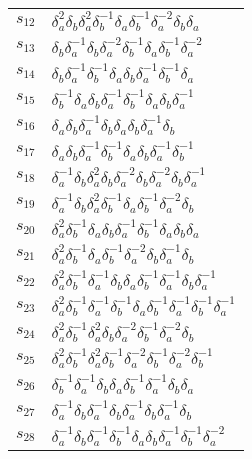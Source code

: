\documentclass{article}
\begin{document}
\begin{center}
\begin{tabular}{ll}
$s_{12}$ & $\delta_a^{2}\delta_b^{}\delta_a^{2}\delta_b^{-1}\delta_a^{}\delta_b^{-1}\delta_a^{-2}\delta_b^{}\delta_a^{}$ \\
$s_{13}$ & $\delta_b^{}\delta_a^{-1}\delta_b^{}\delta_a^{-2}\delta_b^{-1}\delta_a^{}\delta_b^{-1}\delta_a^{-2}$ \\
$s_{14}$ & $\delta_b^{}\delta_a^{-1}\delta_b^{-1}\delta_a^{}\delta_b^{}\delta_a^{-1}\delta_b^{-1}\delta_a^{}$ \\
$s_{15}$ & $\delta_b^{-1}\delta_a^{}\delta_b^{}\delta_a^{-1}\delta_b^{-1}\delta_a^{}\delta_b^{}\delta_a^{-1}$ \\
$s_{16}$ & $\delta_a^{}\delta_b^{}\delta_a^{-1}\delta_b^{}\delta_a^{}\delta_b^{}\delta_a^{-1}\delta_b^{}$ \\
$s_{17}$ & $\delta_a^{}\delta_b^{}\delta_a^{-1}\delta_b^{-1}\delta_a^{}\delta_b^{}\delta_a^{-1}\delta_b^{-1}$ \\
$s_{18}$ & $\delta_a^{-1}\delta_b^{}\delta_a^{2}\delta_b^{}\delta_a^{-2}\delta_b^{}\delta_a^{-2}\delta_b^{}\delta_a^{-1}$ \\
$s_{19}$ & $\delta_a^{-1}\delta_b^{}\delta_a^{2}\delta_b^{-1}\delta_a^{}\delta_b^{-1}\delta_a^{-2}\delta_b^{}$ \\
$s_{20}$ & $\delta_a^{2}\delta_b^{-1}\delta_a^{}\delta_b^{}\delta_a^{-1}\delta_b^{-1}\delta_a^{}\delta_b^{}\delta_a^{}$ \\
$s_{21}$ & $\delta_a^{2}\delta_b^{-1}\delta_a^{}\delta_b^{-1}\delta_a^{-2}\delta_b^{}\delta_a^{-1}\delta_b^{}$ \\
$s_{22}$ & $\delta_a^{2}\delta_b^{-1}\delta_a^{-1}\delta_b^{}\delta_a^{}\delta_b^{-1}\delta_a^{-1}\delta_b^{}\delta_a^{-1}$ \\
$s_{23}$ & $\delta_a^{2}\delta_b^{-1}\delta_a^{-1}\delta_b^{-1}\delta_a^{}\delta_b^{-1}\delta_a^{-1}\delta_b^{-1}\delta_a^{-1}$ \\
$s_{24}$ & $\delta_a^{2}\delta_b^{-1}\delta_a^{2}\delta_b^{}\delta_a^{-2}\delta_b^{-1}\delta_a^{-2}\delta_b^{}$ \\
$s_{25}$ & $\delta_a^{2}\delta_b^{-1}\delta_a^{2}\delta_b^{-1}\delta_a^{-2}\delta_b^{-1}\delta_a^{-2}\delta_b^{-1}$ \\
$s_{26}$ & $\delta_b^{-1}\delta_a^{-1}\delta_b^{}\delta_a^{}\delta_b^{-1}\delta_a^{-1}\delta_b^{}\delta_a^{}$ \\
$s_{27}$ & $\delta_a^{-1}\delta_b^{}\delta_a^{-1}\delta_b^{}\delta_a^{-1}\delta_b^{}\delta_a^{-1}\delta_b^{}$ \\
$s_{28}$ & $\delta_a^{-1}\delta_b^{}\delta_a^{-1}\delta_b^{-1}\delta_a^{}\delta_b^{}\delta_a^{-1}\delta_b^{-1}\delta_a^{-2}$ \\

\end{tabular}
\end{center}
\end{document}
